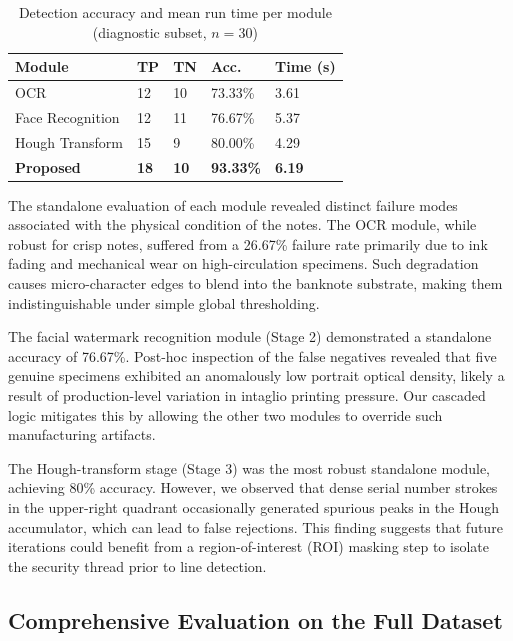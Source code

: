\documentclass[10pt,a4paper,twocolumn,twoside]{article}
\begin{document}
\begin{table}[ht]
\centering
\caption{Detection accuracy and mean run time per module
         (diagnostic subset, $n = 30$)}
\label{tab:results}
\renewcommand{\arraystretch}{1.25}
\begin{tabularx}{\columnwidth}{
  L{2.1cm}
  C{0.7cm}
  C{0.7cm}
  C{1.1cm}
  C{1.3cm}
}
\toprule
\textbf{Module} & \textbf{TP} & \textbf{TN} &
\textbf{Acc.} & \textbf{Time (s)} \\
\midrule
OCR               & 12 & 10 & 73.33\% & 3.61 \\
Face Recognition  & 12 & 11 & 76.67\% & 5.37 \\
Hough Transform   & 15 &  9 & 80.00\% & 4.29 \\
\midrule
\textbf{Proposed} & \textbf{18} & \textbf{10}
                  & \textbf{93.33\%} & \textbf{6.19} \\
\bottomrule
\end{tabularx}
\end{table}

The standalone evaluation of each module revealed distinct failure modes associated with the physical condition of the notes. The OCR module, while robust for crisp notes, suffered from a 26.67\% failure rate primarily due to ink fading and mechanical wear on high-circulation specimens. Such degradation causes micro-character edges to blend into the banknote substrate, making them indistinguishable under simple global thresholding.

The facial watermark recognition module (Stage 2) demonstrated a standalone accuracy of 76.67\%. Post-hoc inspection of the false negatives revealed that five genuine specimens exhibited an anomalously low portrait optical density, likely a result of production-level variation in intaglio printing pressure. Our cascaded logic mitigates this by allowing the other two modules to override such manufacturing artifacts.

The Hough-transform stage (Stage 3) was the most robust standalone module, achieving 80\% accuracy. However, we observed that dense serial number strokes in the upper-right quadrant occasionally generated spurious peaks in the Hough accumulator, which can lead to false rejections. This finding suggests that future iterations could benefit from a region-of-interest (ROI) masking step to isolate the security thread prior to line detection.

\subsection{Comprehensive Evaluation on the Full Dataset}
\end{document}
